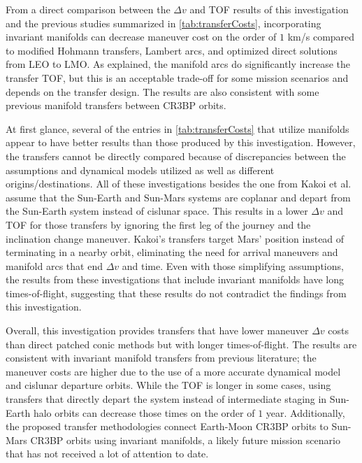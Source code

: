 From a direct comparison between the $\Delta v$ and TOF results of this investigation and the
previous studies summarized in \cref{tab:transferCosts}, incorporating invariant manifolds can
decrease maneuver cost on the order of $1$ km/s compared to modified Hohmann transfers, Lambert
arcs\cite{Eagle:2022}, and optimized direct solutions from LEO to LMO\cite{Miele:1999}. As
explained, the manifold arcs do significantly increase the transfer TOF, but this is an acceptable
trade-off for some mission scenarios and depends on the transfer design. The results are also
consistent with some previous manifold transfers between CR3BP
orbits\cite{Cavallari:2019,Canales:2022}.

At first glance, several of the entries in \cref{tab:transferCosts} that utilize manifolds appear
to have better results than those produced by this investigation. However, the transfers cannot be
directly compared because of discrepancies between the assumptions and dynamical models utilized as
well as different origins/destinations. All of these investigations besides the one from Kakoi et
al. assume that the Sun-Earth and Sun-Mars systems are coplanar and depart from the Sun-Earth
system instead of cislunar space\cite{Topputo:2005,Haibin:2014}. This results in a lower $\Delta v$
and TOF for those transfers by ignoring the first leg of the journey and the inclination change
maneuver. Kakoi's transfers target Mars' position instead of terminating in a nearby orbit,
eliminating the need for arrival maneuvers and manifold arcs that end $\Delta v$ and
time\cite{Kakoi:2014}. Even with those simplifying assumptions, the results from these
investigations that include invariant manifolds have long times-of-flight, suggesting that these
results do not contradict the findings from this investigation.

Overall, this investigation provides transfers that have lower maneuver $\Delta v$ costs than
direct patched conic methods but with longer times-of-flight. The results are consistent with
invariant manifold transfers from previous literature; the maneuver costs are higher due to the use
of a more accurate dynamical model and cislunar departure orbits. While the TOF is longer in some
cases, using transfers that directly depart the system instead of intermediate staging in Sun-Earth
halo orbits can decrease those times on the order of $1$ year. Additionally, the proposed transfer
methodologies connect Earth-Moon CR3BP orbits to Sun-Mars CR3BP orbits using invariant manifolds, a
likely future mission scenario that has not received a lot of attention to date.
